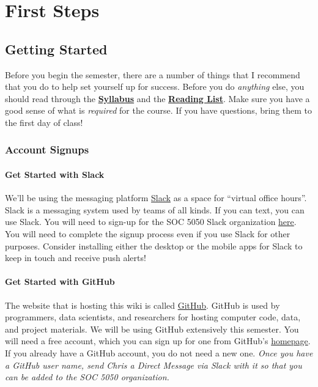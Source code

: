 \documentclass[]{book}
\theoremstyle{definition}
\theoremstyle{definition}
\theoremstyle{definition}
\theoremstyle{remark}
\begin{document}
\part{First Steps}\label{part-first-steps}

\chapter{Getting Started}\label{gettingStarted}

Before you begin the semester, there are a number of things that I
recommend that you do to help set yourself up for success. Before you do
\emph{anything} else, you should read through the
\href{https://cdn.rawgit.com/slu-soc5050/Core-Documents/bdcce556/syllabus.pdf}{\textbf{Syllabus}}
and the
\href{https://cdn.rawgit.com/slu-soc5050/Core-Documents/bdcce556/reading-list.pdf}{\textbf{Reading
List}}. Make sure you have a good sense of what is \emph{required} for
the course. If you have questions, bring them to the first day of class!

\section{Account Signups}\label{account-signups}

\subsection{Get Started with Slack}\label{get-started-with-slack}

We'll be using the messaging platform \href{https://slack.com}{Slack} as
a space for ``virtual office hours''. Slack is a messaging system used
by teams of all kinds. If you can text, you can use Slack. You will need
to sign-up for the SOC 5050 Slack organization
\href{https://join.slack.com/t/slu-soc5050/signup}{here}. You will need
to complete the signup process even if you use Slack for other purposes.
Consider installing either the desktop or the mobile apps for Slack to
keep in touch and receive push alerts!

\subsection{Get Started with GitHub}\label{get-started-with-github}

The website that is hosting this wiki is called
\href{https://github.com/}{GitHub}. GitHub is used by programmers, data
scientists, and researchers for hosting computer code, data, and project
materials. We will be using GitHub extensively this semester. You will
need a free account, which you can sign up for one from GitHub's
\href{https://github.com/}{homepage}. If you already have a GitHub
account, you do not need a new one. \emph{Once you have a GitHub user
name, send Chris a Direct Message via Slack with it so that you can be
added to the SOC 5050 organization.}
\end{document}
